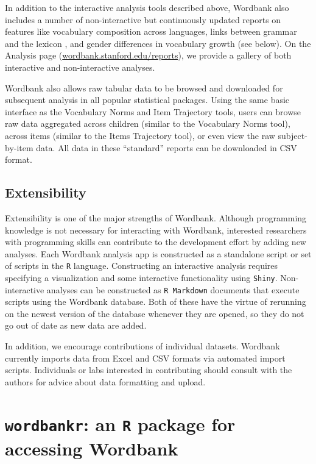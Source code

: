 \documentclass[man,noapacite]{apa}
\begin{document}
In addition to the interactive analysis tools described above, Wordbank also includes a number of non-interactive but continuously updated reports on features like vocabulary composition across languages, links between grammar and the lexicon \cite{braginsky2015}, and gender differences in vocabulary growth (see below). On the Analysis page (\url{wordbank.stanford.edu/reports}), we provide a gallery of both interactive and non-interactive analyses. 

Wordbank also allows raw tabular data to be browsed and downloaded for subsequent analysis in all popular statistical packages. Using the same basic interface as the Vocabulary Norms and Item Trajectory tools, users can browse raw data aggregated across children (similar to the Vocabulary Norms tool), across items (similar to the Items Trajectory tool), or even view the raw subject-by-item data. All data in these ``standard'' reports can be downloaded in CSV format. 

\subsection{Extensibility}

Extensibility is one of the major strengths of Wordbank. Although programming knowledge is not necessary for interacting with Wordbank, interested researchers with programming skills can contribute to the development effort by adding new analyses. Each Wordbank analysis app is constructed as a standalone script or set of scripts in the \texttt{R} language. Constructing an interactive analysis requires specifying a visualization and some interactive functionality using \texttt{Shiny}. Non-interactive analyses can be constructed as \texttt{R Markdown} documents that execute scripts using the Wordbank database. Both of these have the virtue of rerunning on the newest version of the database whenever they are opened, so they do not go out of date as new data are added. 

In addition, we encourage contributions of individual datasets. Wordbank currently imports data from Excel and CSV formats via automated import scripts. Individuals or labs interested in contributing should consult with the authors for advice about data formatting and upload. 

\section{\texttt{wordbankr}: an \texttt{R} package for accessing Wordbank}
\end{document}

